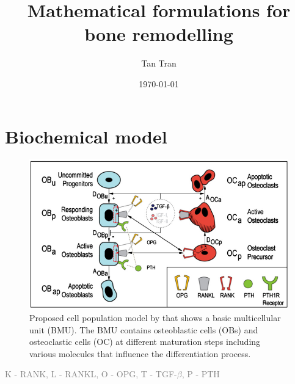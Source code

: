 \documentclass[%
aspectratio=169,  %
]{beamer}
\title[Short title]{Mathematical formulations for bone remodelling}
\author{Tan Tran}
\date{\today}
\begin{document}
\maketitle


\section{Biochemical model}
\begin{frame}
\begin{figure}
\centering
\includegraphics[scale=0.375]{figure_BMU.png}
\caption{Proposed cell population model by \cite{Pivonka.2008} that shows a basic multicellular unit (BMU). The BMU contains osteoblastic cells (OBs) and osteoclastic cells (OC) at different maturation steps including various molecules that influence the differentiation process.}
\end{figure}
\textcolor{gray}{K - RANK, L - RANKL, O - OPG, T - TGF-$\beta$, P - PTH}
\end{frame}
\end{document}
